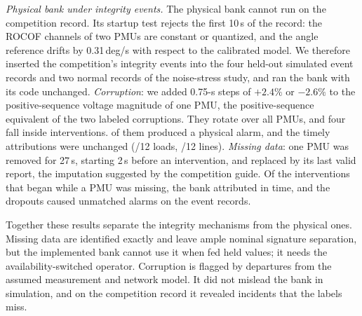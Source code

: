 \emph{Physical bank under integrity events.} The physical bank cannot run on
the competition record. Its startup test rejects the first 10\,s of the
record: the ROCOF channels of two PMUs are constant or quantized, and the
angle reference drifts by 0.31\,deg/s with respect to the calibrated
model. We therefore inserted the competition's integrity events into the
four held-out simulated event records and two normal records of
the noise-stress study, and ran the bank with its code unchanged.
\emph{Corruption}: we added \IntSimCorr{} 0.75-s steps of $+2.4\%$ or
$-2.6\%$ to the positive-sequence voltage magnitude of one PMU, the
positive-sequence equivalent of the two labeled corruptions. They rotate
over all PMUs, and four fall inside interventions. \IntSimCorrAlarm{} of
them produced a physical alarm, and the timely attributions were unchanged
(\IntSimCorrLoad/12 loads, \IntSimCorrLine/12 lines).
\emph{Missing data}: one PMU was removed for 27\,s, starting 2\,s before an
intervention, and replaced by its last valid report, the imputation
suggested by the competition guide. Of the \IntSimMissInside{}
interventions that began while a PMU was missing, the bank attributed
\IntSimMissInsideTimely{} in time, and the dropouts caused \IntSimMissExtras{}
unmatched alarms on the event records. \IntSimMissText{}

Together these results separate the integrity mechanisms from the
physical ones. Missing data are identified exactly and leave ample
nominal signature separation, but the implemented bank
cannot use it when fed held values; it needs the availability-switched
operator. Corruption is flagged by departures from the assumed measurement and network model. It did not mislead the bank in simulation, and on the
competition record it revealed incidents that the labels miss.
